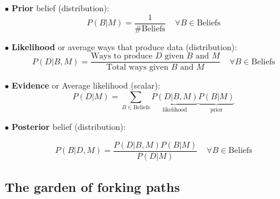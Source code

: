 \documentclass[shownotes]{beamer}
\begin{document}
\begin{frame}
 
 \footnotesize
 
$\bullet$ \textbf{Prior} belief (distribution):
 \begin{equation*}
P(B|M) = \frac{1}{\# \text{Beliefs} }  \ \ \ \ \  \forall B \in \text{Beliefs}  
 \end{equation*}

\pause \vspace{0.3cm}


 $\bullet$ \textbf{Likelihood} or average ways that produce data (distribution):
 \begin{equation*}
P(D|B,M) =  \frac{\text{Ways to produce $D$ given $B$ and $M$}}{\text{Total ways given $B$ and $M$}} \ \ \ \ \  \forall  B \in \text{Beliefs}  
 \end{equation*}

 

\pause \vspace{0.3cm}


$\bullet$ \textbf{Evidence} or Average likelihood (scalar):
\begin{equation*}
 P(D|M) = \sum_{B \in \text{Beliefs}} \underbrace{P(D|B,M)}_{\text{likelihood}} \underbrace{P(B|M)}_{\text{prior}}
\end{equation*}

\pause \vspace{0.3cm}

$\bullet$ \textbf{Posterior} belief (distribution):

\begin{equation*}
 P(B|D,M) = \frac{P(D|B,M)P(B|M)}{P(D|M)}\ \ \ \ \  \forall B \in \text{Beliefs}  
\end{equation*}

 
\end{frame}



\subsection{The garden of forking paths}
\end{document}
